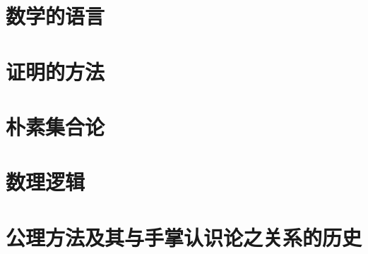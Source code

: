 \chapter{数学的语言}



\chapter{证明的方法}






\chapter{朴素集合论}






\chapter{数理逻辑}




\chapter{公理方法及其与手掌认识论之关系的历史}

